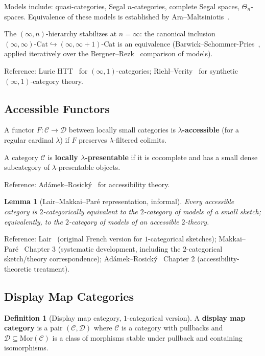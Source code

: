 \documentclass[11pt]{article}
\theoremstyle{plain}
\newtheorem{lemma}[theorem]{Lemma}
\theoremstyle{definition}
\newtheorem{definition}[theorem]{Definition}
\newcommand{\cC}{\mathcal{C}}
\newcommand{\cD}{\mathcal{D}}
\newcommand{\Mor}{\mathrm{Mor}}
\newcommand{\Cat}{\mathrm{Cat}}
\begin{document}
Models include: quasi-categories, Segal $n$-categories, complete Segal spaces, $\Theta_n$-spaces. Equivalence of these models is established by Ara--Maltsiniotis~\cite{AraMaltsiniotis2017}.

The $(\infty, n)$-hierarchy stabilizes at $n = \infty$: the canonical inclusion $(\infty, \infty)\text{-}\Cat \hookrightarrow (\infty, \infty + 1)\text{-}\Cat$ is an equivalence (Barwick--Schommer-Pries~\cite{BarwickSchommerPries2021}, applied iteratively over the Bergner--Rezk~\cite{BergnerRezk2013} comparison of models).

Reference: Lurie HTT~\cite{LurieHTT} for $(\infty, 1)$-categories; Riehl--Verity~\cite{RiehlVerity2022} for synthetic $(\infty, 1)$-category theory.

\subsection{Accessible Functors}

A functor $F : \cC \to \cD$ between locally small categories is \textbf{$\lambda$-accessible} (for a regular cardinal $\lambda$) if $F$ preserves $\lambda$-filtered colimits.

A category $\cC$ is \textbf{locally $\lambda$-presentable} if it is cocomplete and has a small dense subcategory of $\lambda$-presentable objects.

Reference: Ad\'amek--Rosick\'y~\cite{AdamekRosicky1994} for accessibility theory.

\begin{lemma}[Lair--Makkai--Par\'e representation, informal]\label{lem:lair}
Every accessible category is $2$-categorically equivalent to the $2$-category of models of a small sketch; equivalently, to the $2$-category of models of an accessible $2$-theory.
\end{lemma}

Reference: Lair~\cite{Lair1981} (original French version for $1$-categorical sketches); Makkai--Par\'e~\cite{MakkaiPare1989} Chapter 3 (systematic development, including the $2$-categorical sketch/theory correspondence); Ad\'amek--Rosick\'y~\cite{AdamekRosicky1994} Chapter 2 (accessibility-theoretic treatment).

\subsection{Display Map Categories}

\begin{definition}[Display map category, $1$-categorical version]\label{def:display-1cat}
A \textbf{display map category} is a pair $(\cC, \cD)$ where $\cC$ is a category with pullbacks and $\cD \subseteq \Mor(\cC)$ is a class of morphisms stable under pullback and containing isomorphisms.
\end{definition}
\end{document}
